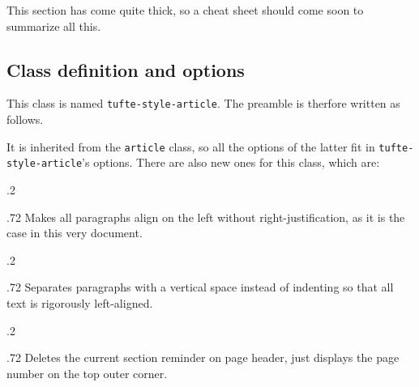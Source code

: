 \documentclass[raggedright, twoside, 11pt]{tufte-style-article}
\begin{document}
This section has come quite thick, so a cheat sheet should come soon to summarize all this.

\subsection{Class definition and options}

This class is named \texttt{tufte-style-article}. The preamble is therfore written as follows.

It is inherited from the \texttt{article} class, so all the options of the latter fit in \texttt{tufte-style-article}'s options. There are also new ones for this class, which are:

\medskip
\begin{minipagewithmarginpars}[t]{.2\textwidth}
	\raggedleft
\end{minipagewithmarginpars}\hfill%
\begin{minipagewithmarginpars}[t]{.72\textwidth}
	Makes all paragraphs align on the left without right-justification, as it is the case in this very document. \\
\end{minipagewithmarginpars}
\smallskip
\begin{minipagewithmarginpars}[t]{.2\textwidth}
	\raggedleft
\end{minipagewithmarginpars}\hfill%
\begin{minipagewithmarginpars}[t]{.72\textwidth}
	Separates paragraphs with a vertical space instead of indenting so that all text is rigorously left-aligned.
\end{minipagewithmarginpars}
\smallskip
\begin{minipagewithmarginpars}[t]{.2\textwidth}
	\raggedleft
\end{minipagewithmarginpars}\hfill%
\begin{minipagewithmarginpars}[t]{.72\textwidth}
	Deletes the current section reminder on page header, just displays the page number on the top outer corner.
\end{minipagewithmarginpars}
\end{document}
